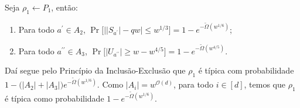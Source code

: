 \begin{prop} \label{typical_whp_P1}

Seja $\rho_{1} \leftarrow P_{1}$, então:

\begin{enumerate}

	\item Para todo $a^{\prime} \in A_{2}$, $\Pr \Big[\big\lvert \lvert S_{a^{\prime}} \rvert - qw \big\rvert \leq w^{1/3} \Big] = 1 - e^{-\widetilde{\Omega}(w^{1/6})}$;
	
	\item Para todo $a^{\prime \prime} \in A_{3}$, $\Pr \big[ \lvert U_{a^{\prime \prime}} \rvert \geq w - w^{4/5} \big] = 1 - e^{-\widetilde{\Omega}(w^{4/5})}$.

\end{enumerate}

Daí segue pelo Princípio da Inclusão-Exclusão que $\rho_{1}$ é típica com probabilidade $1 - \big( \lvert A_{2} \rvert + \lvert A_{3} \rvert \big)e^{-\widetilde{\Omega}(w^{1/6})}$. Como $\lvert A_{i} \rvert = w^{\mathcal{O}(d)}$, para todo $i \in [d]$, temos que $\rho_{1}$ é típica como probabilidade $1 - e^{-\widetilde{\Omega}(w^{1/6})}$.

\end{prop}

